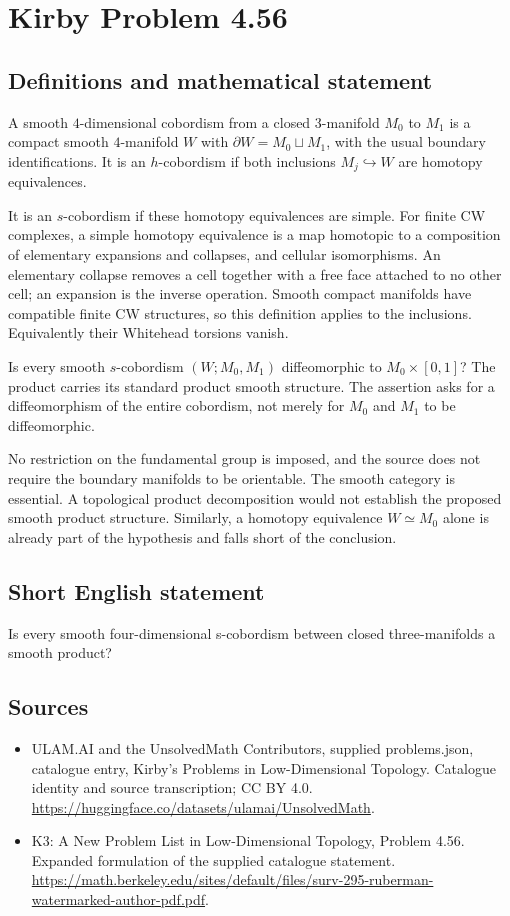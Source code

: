 \documentclass[11pt,a4paper]{article}
\begin{document}
\section*{Kirby Problem 4.56}\label{statement}

\subsection{Definitions and mathematical statement}
A smooth $4$-dimensional cobordism from a closed $3$-manifold $M_0$
to $M_1$ is a compact smooth $4$-manifold $W$ with
$\partial W=M_0\sqcup M_1$, with the usual boundary identifications.
It is an $h$-cobordism if both inclusions $M_j\hookrightarrow W$
are homotopy equivalences.

It is an $s$-cobordism if these homotopy equivalences are simple.
For finite CW complexes, a simple homotopy equivalence is a map
homotopic to a composition of elementary expansions and collapses,
and cellular isomorphisms. An elementary collapse removes a cell
together with a free face attached to no other cell; an expansion
is the inverse operation. Smooth compact manifolds have compatible
finite CW structures, so this definition applies to the inclusions.
Equivalently their Whitehead torsions vanish.

Is every smooth $s$-cobordism $(W;M_0,M_1)$ diffeomorphic to
$M_0\times[0,1]$? The product carries its standard product smooth
structure. The assertion asks for a diffeomorphism of the entire
cobordism, not merely for $M_0$ and $M_1$ to be diffeomorphic.

No restriction on the fundamental group is imposed, and the source
does not require the boundary manifolds to be orientable. The
smooth category is essential. A topological product decomposition
would not establish the proposed smooth product structure. Similarly,
a homotopy equivalence $W\simeq M_0$ alone is already part of the
hypothesis and falls short of the conclusion.
\subsection{Short English statement}
Is every smooth four-dimensional s-cobordism between closed three-manifolds a smooth product?
\subsection{Sources}
\begin{itemize}
\item[S1] ULAM.AI and the UnsolvedMath Contributors, supplied problems.json, catalogue entry, Kirby's Problems in Low-Dimensional Topology. Catalogue identity and source transcription; CC BY 4.0.
\url{https://huggingface.co/datasets/ulamai/UnsolvedMath}.
\item[S2] K3: A New Problem List in Low-Dimensional Topology, Problem 4.56. Expanded formulation of the supplied catalogue statement.
\url{https://math.berkeley.edu/sites/default/files/surv-295-ruberman-watermarked-author-pdf.pdf}.
\end{itemize}
\end{document}
